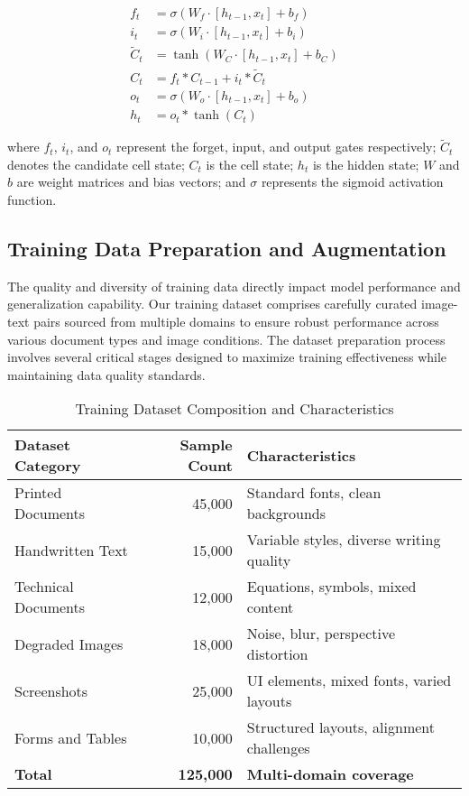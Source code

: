 \begin{align}
    f_t &= \sigma(W_f \cdot [h_{t-1}, x_t] + b_f) \\
    i_t &= \sigma(W_i \cdot [h_{t-1}, x_t] + b_i) \\
    \tilde{C}_t &= \tanh(W_C \cdot [h_{t-1}, x_t] + b_C) \\
    C_t &= f_t * C_{t-1} + i_t * \tilde{C}_t \\
    o_t &= \sigma(W_o \cdot [h_{t-1}, x_t] + b_o) \\
    h_t &= o_t * \tanh(C_t)
\end{align}

where $f_t$, $i_t$, and $o_t$ represent the forget, input, and output gates respectively; $\tilde{C}_t$ denotes the candidate cell state; $C_t$ is the cell state; $h_t$ is the hidden state; $W$ and $b$ are weight matrices and bias vectors; and $\sigma$ represents the sigmoid activation function.

\subsection{Training Data Preparation and Augmentation}

The quality and diversity of training data directly impact model performance and generalization capability. Our training dataset comprises carefully curated image-text pairs sourced from multiple domains to ensure robust performance across various document types and image conditions. The dataset preparation process involves several critical stages designed to maximize training effectiveness while maintaining data quality standards.

\begin{table}[H]
\centering
\caption{Training Dataset Composition and Characteristics}
\label{tab:training_data}
\begin{tabular}{|l|r|l|}
\hline
\textbf{Dataset Category} & \textbf{Sample Count} & \textbf{Characteristics} \\
\hline
Printed Documents & 45,000 & Standard fonts, clean backgrounds \\
\hline
Handwritten Text & 15,000 & Variable styles, diverse writing quality \\
\hline
Technical Documents & 12,000 & Equations, symbols, mixed content \\
\hline
Degraded Images & 18,000 & Noise, blur, perspective distortion \\
\hline
Screenshots & 25,000 & UI elements, mixed fonts, varied layouts \\
\hline
Forms and Tables & 10,000 & Structured layouts, alignment challenges \\
\hline
\textbf{Total} & \textbf{125,000} & \textbf{Multi-domain coverage} \\
\hline
\end{tabular}
\end{table}

